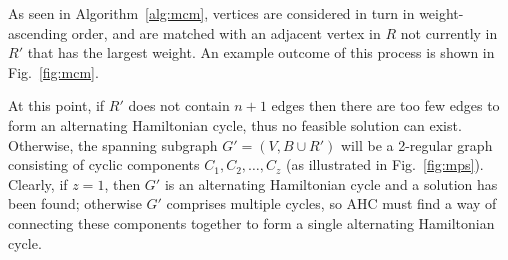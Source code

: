 \documentclass[authoryear]{elsarticle}
\begin{document}
\begin{comment}
The first subprocedure of AHC is the Maximum Cardinality Matching (MCM) algorithm, which is used to produce a matching $R'$ from $R$ \citep{mahadev1994}. MCM takes each vertex $v_1, v_2,\dotsc,v_{2n+2}$ and adds to $R'$ the edge from $R$ connecting $v_i$ to the largest vertex $v_j$ that is not incident to an edge in already in $R'$. Pairs of vertices incident to edges in $R'$ are then said to be \emph{matched}. As with partners, the bijective function $m : V \to V$ associates with each vertex $v_i \in V$ its match, $m(v_i)$, thus the set can then be denoted as $R' = \{(v_i, m(v_i)): v_i \in V\}$. In the event that a vertex $v_i$ is not adjacent to any other vertex via an edge in $R$, the previous vertex $v_{i-1}$ can be rematched, provided 
\begin{enumerate*}[label={(\alph*)}]
	\item $i \neq 1$;
	\item $v_{i-1}$ has been matched; and
	\item $(v_{i-1}, p(v_i)) \in R$.
\end{enumerate*} 
Then, we simply set $m(v_i) = m(v_{i-1})$, and $m(v_{i-1}) = p(v_i)$. %
\end{comment}

\noindent As seen in Algorithm~\ref{alg:mcm}, vertices are considered in turn in weight-ascending order, and are matched with an adjacent vertex in $R$ not currently in $R'$ that has the largest weight. An example outcome of this process is shown in Fig.~\ref{fig:mcm}. 

At this point, if $R'$ does not contain $n+1$ edges then there are too few edges to form an alternating Hamiltonian cycle, thus no feasible solution can exist. Otherwise, the spanning subgraph $G'=(V, B \cup R')$ will be a 2-regular graph consisting of cyclic components $C_1,C_2,\dotsc,C_z$ (as illustrated in Fig.~\ref{fig:mps}). Clearly, if $z = 1$, then $G'$ is an alternating Hamiltonian cycle and a solution has been found; otherwise $G'$ comprises multiple cycles, so AHC must find a way of connecting these components together to form a single alternating Hamiltonian cycle.
\end{document}
